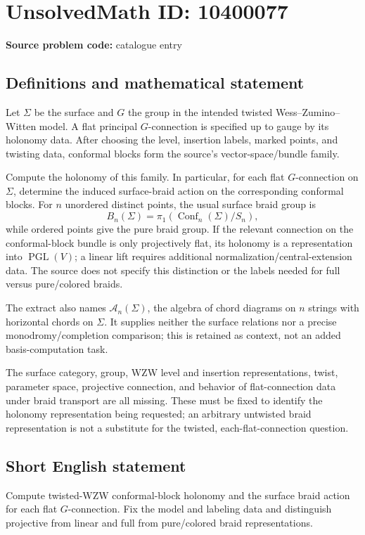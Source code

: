 \documentclass[11pt]{article}
\begin{document}
\section*{UnsolvedMath ID: 10400077}
\textbf{Source problem code:} catalogue entry
\subsection{Definitions and mathematical statement}
Let $\Sigma$ be the surface and $G$ the group in the intended twisted Wess--Zumino--Witten model. A flat principal $G$-connection is specified up to gauge by its holonomy data. After choosing the level, insertion labels, marked points, and twisting data, conformal blocks form the source's vector-space/bundle family.

Compute the holonomy of this family. In particular, for each flat $G$-connection on $\Sigma$, determine the induced surface-braid action on the corresponding conformal blocks. For $n$ unordered distinct points, the usual surface braid group is
\[
B_n(\Sigma)=\pi_1(\operatorname{Conf}_n(\Sigma)/S_n),
\]
while ordered points give the pure braid group. If the relevant connection on the conformal-block bundle is only projectively flat, its holonomy is a representation into $\operatorname{PGL}(V)$; a linear lift requires additional normalization/central-extension data. The source does not specify this distinction or the labels needed for full versus pure/colored braids.

The extract also names $\mathcal A_n(\Sigma)$, the algebra of chord diagrams on $n$ strings with horizontal chords on $\Sigma$. It supplies neither the surface relations nor a precise monodromy/completion comparison; this is retained as context, not an added basis-computation task.

The surface category, group, WZW level and insertion representations, twist, parameter space, projective connection, and behavior of flat-connection data under braid transport are all missing. These must be fixed to identify the holonomy representation being requested; an arbitrary untwisted braid representation is not a substitute for the twisted, each-flat-connection question.
\subsection{Short English statement}
Compute twisted-WZW conformal-block holonomy and the surface braid action for each flat $G$-connection. Fix the model and labeling data and distinguish projective from linear and full from pure/colored braid representations.
\end{document}
